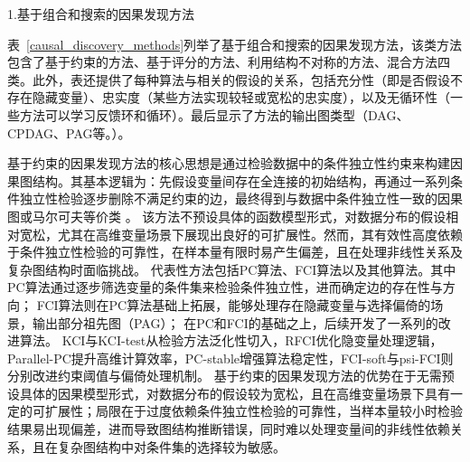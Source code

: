 {\hei 1.基于组合和搜索的因果发现方法}

表~\ref{causal_discovery_methods}列举了基于组合和搜索的因果发现方法，该类方法包含了基于约束的方法、基于评分的方法、利用结构不对称的方法、混合方法四类。此外，表还提供了每种算法与相关的假设的关系，包括充分性（即是否假设不存在隐藏变量）、忠实度（某些方法实现较轻或宽松的忠实度），以及无循环性（一些方法可以学习反馈环和循环）。最后显示了方法的输出图类型（DAG、CPDAG、PAG等。）。

基于约束的因果发现方法的核心思想是通过检验数据中的条件独立性约束来构建因果图结构。其基本逻辑为：先假设变量间存在全连接的初始结构，再通过一系列条件独立性检验逐步删除不满足约束的边，最终得到与数据中条件独立性一致的因果图或马尔可夫等价类 \cite{Glymour2019}。
该方法不预设具体的函数模型形式，对数据分布的假设相对宽松，尤其在高维变量场景下展现出良好的可扩展性\cite{Schoelkopf2021}。然而，其有效性高度依赖于条件独立性检验的可靠性，在样本量有限时易产生偏差，且在处理非线性关系及复杂图结构时面临挑战\cite{Schoelkopf2021}。
代表性方法包括PC算法、FCI算法以及其他算法\cite{孙光冬2026}。其中PC算法通过逐步筛选变量的条件集来检验条件独立性，进而确定边的存在性与方向\cite{Spirtes2000}；
FCI算法则在PC算法基础上拓展，能够处理存在隐藏变量与选择偏倚的场景，输出部分祖先图（PAG）\cite{Spirtes1995}；
在PC和FCI的基础之上，后续开发了一系列的改进算法。
KCI\cite{Sun2007}与KCI-test\cite{Zhang2012}从检验方法泛化性切入，RFCI\cite{Colombo2011}优化隐变量处理逻辑，Parallel-PC\cite{Le2019}提升高维计算效率，PC-stable\cite{Colombo2014}增强算法稳定性，FCI-soft\cite{Kocaoglu2020}与psi-FCI\cite{Jaber2020}则分别改进约束阈值与偏倚处理机制。
基于约束的因果发现方法的优势在于无需预设具体的因果模型形式，对数据分布的假设较为宽松，且在高维变量场景下具有一定的可扩展性；局限在于过度依赖条件独立性检验的可靠性，当样本量较小时检验结果易出现偏差，进而导致图结构推断错误，同时难以处理变量间的非线性依赖关系，且在复杂图结构中对条件集的选择较为敏感\cite{Vowels2022}。

